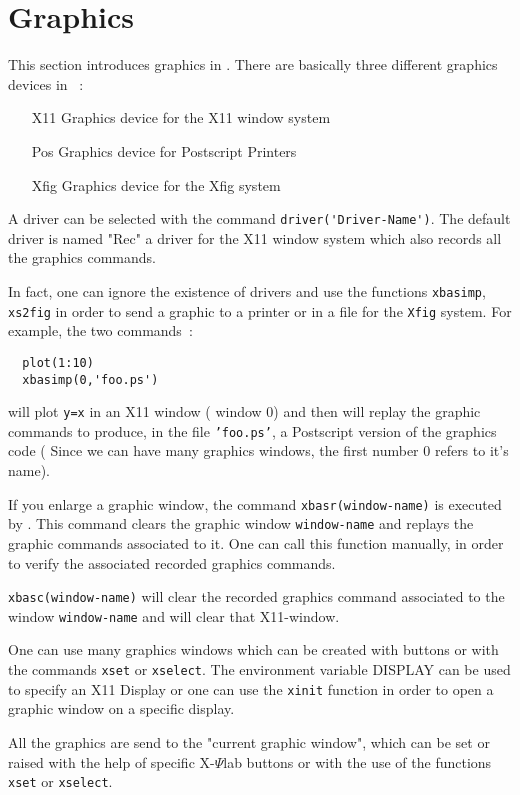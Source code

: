 \chapter{Graphics}

This section introduces graphics in \Scilab. There are basically three
different graphics devices in \Scilab~:
\begin{itemize}
 \item[X11] Graphics device for the X11 window system 
 \item[Pos] Graphics device for Postscript Printers 
 \item[Xfig]Graphics device for the Xfig system
\end{itemize}
A driver can be selected with the command
\verb+driver('Driver-Name')+. The default driver is named "Rec" a
driver for the X11 window system which also records all the graphics
commands. 

In fact, one can ignore the existence of drivers and use the
functions \verb+xbasimp+, \verb+xs2fig+ in order to send a graphic 
to a printer or in a file for the \verb+Xfig+ system. For example, the
two commands~:
\begin{verbatim}
  plot(1:10) 
  xbasimp(0,'foo.ps')
\end{verbatim}

will plot \verb+y=x+ in an X11 window ( window 0) 
and then will replay the graphic
commands to produce, in the file {\tt 'foo.ps'}, a Postscript version of the
graphics code ( Since we can have many graphics windows, the first
number $0$ refers to it's name).

If you enlarge a graphic window, the command \verb+xbasr(window-name)+
is executed by \Scilab. This command clears the graphic window
\verb+window-name+ and replays the graphic commands associated to it. One can
call this function manually, in order to verify the associated
recorded graphics commands. 

\verb+xbasc(window-name)+ will clear
the recorded \Scilab graphics command associated to
the window \verb+window-name+ and will clear that X11-window.

One can use many graphics windows which can be created with buttons 
or with the commands \verb+xset+ or \verb+xselect+. The environment 
variable DISPLAY can be used to specify an X11 Display or one can use
the \verb+xinit+ function in order to open a graphic window on a
specific display. 

All the graphics are send to the "current graphic window", 
which can be set or raised with the help of specific X-$\Psi$lab
buttons or with the use of the functions \verb+xset+ or \verb+xselect+.

